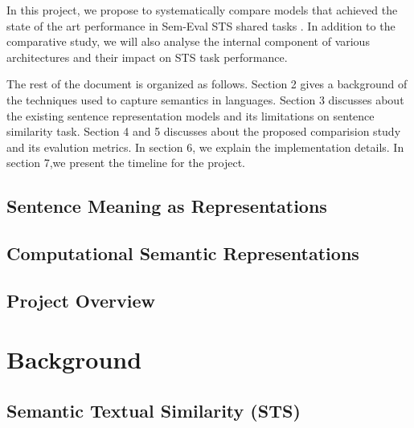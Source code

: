 \documentclass[12pt]{report} %
\begin{document}
	
	 In this project, we propose to systematically compare models that achieved the state of the art performance in Sem-Eval STS shared tasks \citep{cer2017semeval}.  In addition to the comparative study, we will also analyse the internal component of various architectures and their impact on STS task performance.
	 
	 The rest of the document is organized as follows. Section 2 gives a background of the techniques used to capture semantics in languages. Section 3 discusses about the existing sentence representation models and its limitations on sentence similarity task. Section 4 and 5 discusses about the proposed comparision study and its evalution metrics. In section 6, we explain the implementation details. In section 7,we present the timeline for the project.
	 
\section{Sentence Meaning as Representations}
\section{Computational Semantic Representations}
\section{Project Overview}	
	
	

\chapter{Background}
\section{Semantic Textual Similarity (STS)}
\end{document}
